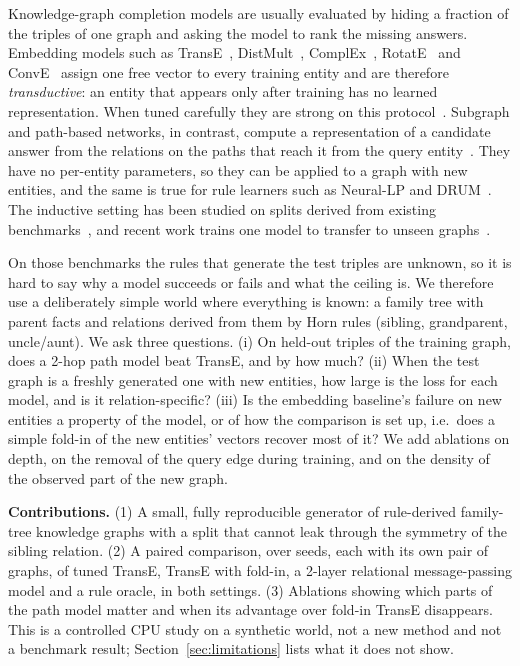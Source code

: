 Knowledge-graph completion models are usually evaluated by hiding a fraction of the triples of one graph and asking the model to rank the missing answers. Embedding models such as TransE~\cite{Bordes2013TranslatingEF}, DistMult~\cite{yang2014embedding}, ComplEx~\cite{trouillon2016complex}, RotatE~\cite{sun2019rotate} and ConvE~\cite{dettmers2017convolutional} assign one free vector to every training entity and are therefore \emph{transductive}: an entity that appears only after training has no learned representation. When tuned carefully they are strong on this protocol~\cite{rossi2020knowledge}. Subgraph and path-based networks, in contrast, compute a representation of a candidate answer from the relations on the paths that reach it from the query entity~\cite{teru2019inductive,zhu2021neural,wang2020relational,geng2022relational}. They have no per-entity parameters, so they can be applied to a graph with new entities, and the same is true for rule learners such as Neural-LP and DRUM~\cite{yang2017differentiable,sadeghian2019drum}. The inductive setting has been studied on splits derived from existing benchmarks~\cite{teru2019inductive,galkin2022open}, and recent work trains one model to transfer to unseen graphs~\cite{galkin2023foundation}.

On those benchmarks the rules that generate the test triples are unknown, so it is hard to say why a model succeeds or fails and what the ceiling is. We therefore use a deliberately simple world where everything is known: a family tree with parent facts and relations derived from them by Horn rules (sibling, grandparent, uncle/aunt). We ask three questions. (i) On held-out triples of the training graph, does a 2-hop path model beat TransE, and by how much? (ii) When the test graph is a freshly generated one with new entities, how large is the loss for each model, and is it relation-specific? (iii) Is the embedding baseline's failure on new entities a property of the model, or of how the comparison is set up, i.e.\ does a simple fold-in of the new entities' vectors recover most of it? We add ablations on depth, on the removal of the query edge during training, and on the density of the observed part of the new graph.

\vspace{4pt}\noindent\textbf{Contributions.} (1) A small, fully reproducible generator of rule-derived family-tree knowledge graphs with a split that cannot leak through the symmetry of the sibling relation. (2) A paired comparison, over  seeds, each with its own pair of graphs, of tuned TransE, TransE with fold-in, a 2-layer relational message-passing model and a rule oracle, in both settings. (3) Ablations showing which parts of the path model matter and when its advantage over fold-in TransE disappears. This is a controlled CPU study on a synthetic world, not a new method and not a benchmark result; Section~\ref{sec:limitations} lists what it does not show.
